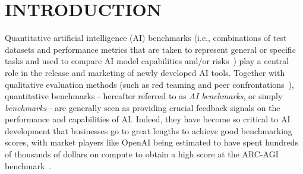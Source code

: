 \section{INTRODUCTION} 




Quantitative artificial intelligence (AI) benchmarks (i.e., combinations of test datasets and performance metrics that are taken to represent general or specific tasks and used to compare AI model capabilities and/or risks~\cite{raji2021}) play a central role in the release and marketing of newly developed AI tools. Together with qualitative evaluation methods (such as red teaming and peer confrontations~\cite{chollet2019}), quantitative benchmarks - hereafter referred to as \textit{AI benchmarks}, or simply \textit{benchmarks} - are generally seen as providing crucial feedback signals on the performance and capabilities of AI. Indeed, they have become so critical to AI development that businesses go to great lengths to achieve good benchmarking scores, with market players like OpenAI being estimated to have spent hundreds of thousands of dollars on compute to obtain a high score at the ARC-AGI benchmark~\cite{pfister2025}.

